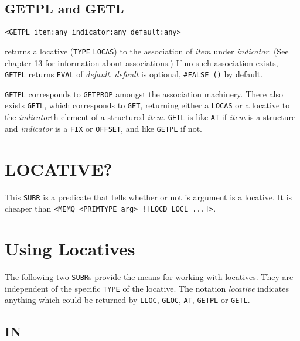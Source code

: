\documentclass[a4paper]{scrbook}
\begin{document}
\subsection{GETPL and GETL}\label{getpl-and-getl}

\begin{verbatim}
<GETPL item:any indicator:any default:any>
\end{verbatim}

 returns a locative (\texttt{TYPE} \texttt{LOCAS}) to the
association of \emph{item} under \emph{indicator}. (See chapter 13 for information about associations.) If no such
association exists, \texttt{GETPL} returns \texttt{EVAL} of \emph{default}. \emph{default} is optional,
\texttt{\#FALSE\ ()} by default.

\texttt{GETPL} corresponds to \texttt{GETPROP} amongst the association machinery. There also exists
\texttt{GETL}, which corresponds to \texttt{GET}, returning either a \texttt{LOCAS} or a
locative to the \emph{indicator}th element of a structured \emph{item}. \texttt{GETL} is like \texttt{AT} if \emph{item} is
a structure and \emph{indicator} is a \texttt{FIX} or \texttt{OFFSET}, and like \texttt{GETPL} if not.

\section{LOCATIVE?}\label{locative}

This \texttt{SUBR} is a predicate that tells whether or not is argument is a locative. It
is cheaper than
\texttt{\textless{}MEMQ\ \textless{}PRIMTYPE\ arg\textgreater{}\ \textquotesingle{}!{[}LOCD\ LOCL\ ...{]}\textgreater{}}.

\section{Using Locatives}\label{using-locatives}

The following two \texttt{SUBR}s provide the means for working with locatives. They are independent of the specific
\texttt{TYPE} of the locative. The notation \emph{locative} indicates anything which could be returned by \texttt{LLOC},
\texttt{GLOC}, \texttt{AT}, \texttt{GETPL} or \texttt{GETL}.

\subsection{IN}\label{in}
\end{document}
